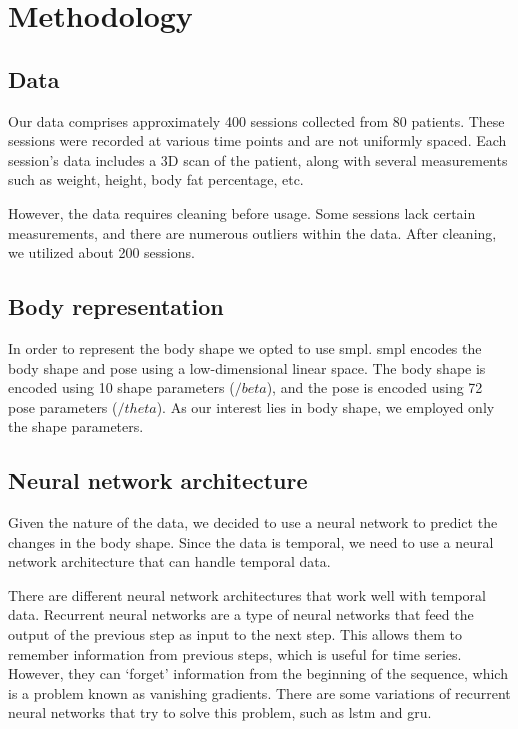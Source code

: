 
\chapter{Methodology}\label{methodology}

\section{Data}

Our data comprises approximately 400 sessions collected from 80 patients. These
sessions were recorded at various time points and are not uniformly spaced.
Each session's data includes a 3D scan of the patient, along with several
measurements such as weight, height, body fat percentage, etc.

However, the data requires cleaning before usage. Some sessions lack certain
measurements, and there are numerous outliers within the data. After cleaning,
we utilized about 200 sessions.

\section{Body representation}

In order to represent the body shape we opted to use \gls{smpl}. \gls{smpl}
encodes the body shape and pose using a low-dimensional linear space. The body
shape is encoded using 10 shape parameters ($/beta$), and the pose is encoded
using 72 pose parameters ($/theta$). As our interest lies in body shape, we
employed only the shape parameters.

\section{Neural network architecture}

Given the nature of the data, we decided to use a neural network to predict the
changes in the body shape. Since the data is temporal, we need to use a neural
network architecture that can handle temporal data.

There are different neural network architectures that work well with temporal
data. Recurrent neural networks are a type of neural networks that feed the
output of the previous step as input to the next step. This allows them to
remember information from previous steps, which is useful for time series.
However, they can `forget' information from the beginning of the sequence,
which is a problem known as vanishing gradients. There are some variations of
recurrent neural networks that try to solve this problem, such as \gls{lstm}
and \gls{gru}.

